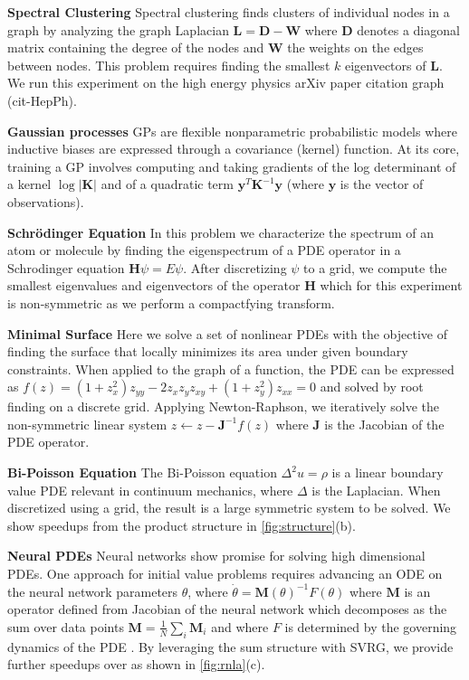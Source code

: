 \documentclass{article}
\newcommand{\mbf}[1]{{\boldsymbol{\mathbf{#1}}}}
\renewcommand{\bm}{\mbf}
\begin{document}
\textbf{Spectral Clustering} \quad
Spectral clustering \citep{ng2001spectral} finds clusters of individual nodes in a graph by analyzing the graph Laplacian $\bm{L} = \bm{D} - \bm{W}$
where $\bm{D}$ denotes a diagonal matrix containing the degree of the nodes and $\bm{W}$ the weights on the edges between nodes.
This problem requires finding the smallest $k$ eigenvectors of $\bm{L}$.
We run this experiment on the high energy physics arXiv paper citation graph (cit-HepPh).

\textbf{Gaussian processes} \quad
GPs are flexible nonparametric probabilistic models where inductive biases are expressed through a covariance (kernel) function.
At its core, training a GP involves computing and taking gradients of the log determinant of a kernel $\log \left|\bm{K}\right|$ and of a
quadratic term $\bm{y}^{T} \bm{K}^{-1} \bm{y}$ (where $\bm{y}$ is the vector of observations).

\textbf{Schr\"{o}dinger Equation} \quad
In this problem we characterize the spectrum of an atom or molecule by finding the eigenspectrum of a PDE operator in a Schrodinger equation $\bm{H}\psi = E\psi$.
After discretizing $\psi$ to a grid, we compute the smallest eigenvalues and eigenvectors of the operator $\bm{H}$ which for this experiment is
non-symmetric as we perform a compactfying transform.

\textbf{Minimal Surface} \quad
Here we solve a set of nonlinear PDEs with the objective of finding the surface that locally minimizes its area under given boundary constraints.
When applied to the graph of a function, the PDE can be expressed as $f(z)=(1+z_x^2)z_{yy}-2z_xz_yz_{xy}+(1+z_y^2)z_{xx}=0$ and solved by root finding on a discrete grid.
Applying Newton-Raphson, we iteratively solve the non-symmetric linear system $z \gets  z-\bm{J}^{-1}f(z)$ where $\bm{J}$ is the Jacobian of the PDE operator.

\textbf{Bi-Poisson Equation} \quad
The Bi-Poisson equation $\Delta^2 u = \rho$ is a linear boundary value PDE relevant in continuum mechanics, where $\Delta$ is the Laplacian. When discretized using a grid, the result is a large symmetric system to be solved. We show speedups from the product structure in \autoref{fig:structure}(b).

\textbf{Neural PDEs} \quad
Neural networks show promise for solving high dimensional PDEs.
One approach for initial value problems requires advancing an ODE on the neural network parameters $\theta$, where
$\dot{\theta} = \bm{M}(\theta)^{-1}F(\theta)$
where $\bm{M}$ is an operator defined from Jacobian of the neural network which decomposes as the sum over data points $\bm{M} = \tfrac{1}{N}\sum_i \bm{M}_i$ and where $F$ is determined by the governing dynamics of the PDE \citep{du2021evolutional,finzi2023nivp}.
By leveraging the sum structure with SVRG, we provide further speedups over \citet{finzi2023nivp} as shown in \autoref{fig:rnla}(c).
\end{document}
